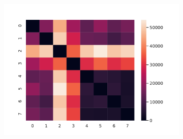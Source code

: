 \documentclass[10pt]{beamer}
\begin{document}
\begin{frame}[fragile]{}
\begin{figure}[ht]
\begin{subfigure}{.32 \linewidth}
    \includegraphics[scale=0.2]{persistence_diagrams/distances/heatmaps/wasserstein_h2.npy.pdf}
  \end{subfigure}%
\end{figure}
\end{frame}
\end{document}
